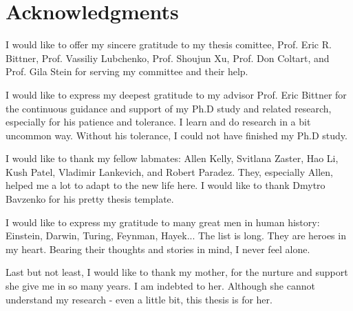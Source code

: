 \begingroup
\let\clearpage\relax
\let\cleardoublepage\relax
\let\cleardoublepage\relax
\chapter*{Acknowledgments}


I would like to offer my sincere gratitude to my thesis comittee, Prof. Eric R. Bittner, Prof. Vassiliy Lubchenko, Prof. Shoujun Xu, Prof. Don Coltart, and Prof. Gila Stein for serving my committee and their help.

I would like to express my deepest gratitude to my advisor Prof. Eric Bittner for the continuous guidance and support of my Ph.D study and related research, especially for his patience and tolerance. I learn and do research in a bit uncommon way. Without his tolerance, I could not have finished my Ph.D study.

I would like to thank my fellow labmates: Allen Kelly, Svitlana Zaster, Hao Li, Kush Patel, Vladimir Lankevich, and Robert Paradez. They, especially Allen, helped me a lot to adapt to the new life here. I would like to thank Dmytro Bavzenko for his pretty thesis template.

I would like to express my gratitude to many great men in human history: Einstein, Darwin, Turing, Feynman, Hayek... The list is long. They are heroes in my heart. Bearing their thoughts and stories in mind, I never feel alone.

Last but not least, I would like to thank my mother, for the nurture and support she give me in so many years. I am indebted to her. Although she cannot understand my research - even a little bit, this thesis is for her.
\endgroup




